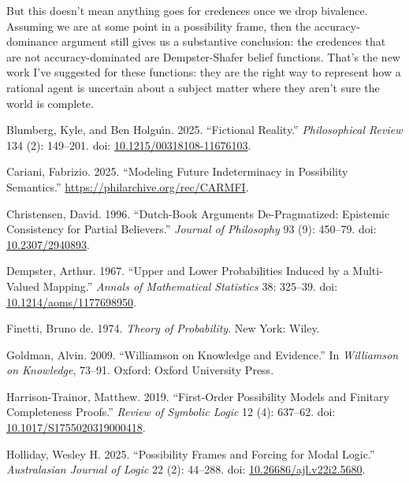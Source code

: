 \documentclass[
  11pt,
  letterpaper,
  DIV=11,
  numbers=noendperiod,
  twoside]{scrartcl}
\newlength{\cslhangindent}
\newenvironment{CSLReferences}[2] %
 {\begin{list}{}{%
  \setlength{\itemindent}{0pt}
  \setlength{\leftmargin}{0pt}
  \setlength{\parsep}{0pt}
  \ifodd #1
   \setlength{\leftmargin}{\cslhangindent}
   \setlength{\itemindent}{-1\cslhangindent}
  \fi
  \setlength{\itemsep}{#2\baselineskip}}}
 {\end{list}}
\begin{document}
But this doesn't mean anything goes for credences once we drop
bivalence. Assuming we are at some point in a possibility frame, then
the accuracy-dominance argument still gives us a substantive conclusion:
the credences that are not accuracy-dominated are Dempster-Shafer belief
functions. That's the new work I've suggested for these functions: they
are the right way to represent how a rational agent is uncertain about a
subject matter where they aren't sure the world is complete.

\protect{}\label{refs}
\begin{CSLReferences}{1}{0}
Blumberg, Kyle, and Ben Holguı́n. 2025. {``Fictional Reality.''}
\emph{Philosophical Review} 134 (2): 149--201. doi:
\href{https://doi.org/10.1215/00318108-11676103}{10.1215/00318108-11676103}.

Cariani, Fabrizio. 2025. {``Modeling Future Indeterminacy in Possibility
Semantics.''} \url{https://philarchive.org/rec/CARMFI}.

Christensen, David. 1996. {``Dutch-Book Arguments {D}e-Pragmatized:
Epistemic Consistency for Partial Believers.''} \emph{Journal of
Philosophy} 93 (9): 450--79. doi:
\href{https://doi.org/10.2307/2940893}{10.2307/2940893}.

Dempster, Arthur. 1967. {``Upper and Lower Probabilities Induced by a
Multi-Valued Mapping.''} \emph{Annals of Mathematical Statistics} 38:
325--39. doi:
\href{https://doi.org/10.1214/aoms/1177698950}{10.1214/aoms/1177698950}.

Finetti, Bruno de. 1974. \emph{Theory of Probability}. New York: Wiley.

Goldman, Alvin. 2009. {``Williamson on Knowledge and Evidence.''} In
\emph{{Williamson on Knowledge}}, 73--91. Oxford: Oxford University
Press.

Harrison-Trainor, Matthew. 2019. {``First-Order Possibility Models and
Finitary Completeness Proofs.''} \emph{Review of Symbolic Logic} 12 (4):
637--62. doi:
\href{https://doi.org/10.1017/S1755020319000418}{10.1017/S1755020319000418}.

Holliday, Wesley H. 2025. {``Possibility Frames and Forcing for Modal
Logic.''} \emph{Australasian Journal of Logic} 22 (2): 44--288. doi:
\href{https://doi.org/10.26686/ajl.v22i2.5680}{10.26686/ajl.v22i2.5680}.


\end{CSLReferences}
\end{document}
